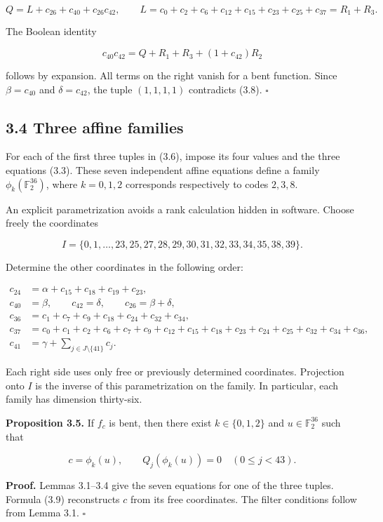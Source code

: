 \documentclass[pdflatex,sn-mathphys-num]{sn-jnl}
\begin{document}
\[
Q=L+c_{26}+c_{40}+c_{26}c_{42},\qquad
L=c_0+c_2+c_6+c_{12}+c_{15}+c_{23}+c_{25}+c_{37}=R_1+R_3.
\]

The Boolean identity

\[
c_{40}c_{42}=Q+R_1+R_3+(1+c_{42})R_2 \tag{3.8}
\]

follows by expansion. All terms on the right vanish for a bent function. Since $\beta=c_{40}$ and $\delta=c_{42}$, the tuple $(1,1,1,1)$ contradicts (3.8). \hfill$\square$

\subsection*{3.4 Three affine families}

For each of the first three tuples in (3.6), impose its four values and the three equations (3.3). These seven independent affine equations define a family $\phi_k(\mathbb F_2^{36})$, where $k=0,1,2$ corresponds respectively to codes $2,3,8$.

An explicit parametrization avoids a rank calculation hidden in software. Choose freely the coordinates

\[
I=\{0,1,\ldots,23,25,27,28,29,30,31,32,33,34,35,38,39\}.
\]

Determine the other coordinates in the following order:

\[
\begin{aligned}
c_{24}&=\alpha+c_{15}+c_{18}+c_{19}+c_{23},\\
c_{40}&=\beta,\qquad c_{42}=\delta,\qquad c_{26}=\beta+\delta,\\
c_{36}&=c_1+c_7+c_9+c_{18}+c_{24}+c_{32}+c_{34},\\
c_{37}&=c_0+c_1+c_2+c_6+c_7+c_9+c_{12}+c_{15}+c_{18}
 +c_{23}+c_{24}+c_{25}+c_{32}+c_{34}+c_{36},\\
c_{41}&=\gamma+\sum_{j\in J\setminus\{41\}}c_j.
\end{aligned} \tag{3.9}
\]

Each right side uses only free or previously determined coordinates. Projection onto $I$ is the inverse of this parametrization on the family. In particular, each family has dimension thirty-six.

\textbf{Proposition 3.5.} If $f_c$ is bent, then there exist $k\in\{0,1,2\}$ and $u\in\mathbb F_2^{36}$ such that

\[
c=\phi_k(u),\qquad Q_j(\phi_k(u))=0\quad(0\le j<43). \tag{3.10}
\]

\textbf{Proof.} Lemmas 3.1--3.4 give the seven equations for one of the three tuples. Formula (3.9) reconstructs $c$ from its free coordinates. The filter conditions follow from Lemma 3.1. \hfill$\square$
\end{document}
